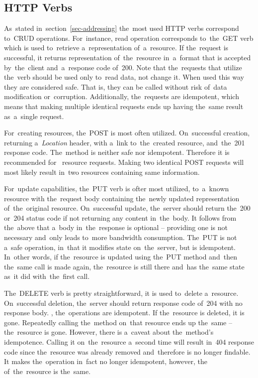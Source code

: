 \subsection{HTTP Verbs}
\label{lab-verbs}
As~stated in~section~\ref{sec-addressing} the~most used HTTP verbs correspond
to~CRUD operations. For~instance, read operation corresponds to~the~GET verb
which is used to~retrieve a~representation of~a~resource. If the~request is
successful, it returns representation of~the~resource in~a~format that is
accepted by~the~client and~a~response code of~200. Note that the~requests that
utilize the~verb should be used only to~read data, not change it. When used this
way they are considered safe. That is, they can be called without risk of~data
modification or~corruption. Additionally, the~requests are idempotent, which
means that making multiple identical requests ends up having the~same result
as~a~single request.

For~creating resources, the~POST is most often utilized. On~successful creation,
returning a~\textit{Location} header, with a~link to~the~created resource,
and~the~201 response code. The~method is neither safe nor idempotent. Therefore
it is recommended for~ resource requests. Making two
identical POST requests will most likely result in~two resources containing same
information.

For~update capabilities, the~PUT verb is ofter most utilized, 
to~a~known resource with the~request body containing the~newly updated
representation of~the~original resource. On~successful update, the~server should
return the~200 or~204 status code if not returning any content in~the~body. It
follows from the~above that a~body in~the~response is optional -- providing one
is not necessary and~only leads to~more bandwidth consumption. The~PUT is not
a~safe operation, in~that it modifies state on~the~server, but is idempotent.
In~other words, if the~resource is updated using the~PUT method and~then
the~same call is made again, the~resource is still there and~has the~same state
as~it did with~the~first call.

The~DELETE verb is pretty straightforward, it is used to~delete a~resource.
On~successful deletion, the~server should return response code of~204 with no
response body. , the~operations are idempotent. If
the~resource is deleted, it is gone. Repeatedly calling the~method on~that
resource ends up the~same -- the~resource is gone. However, there is a~caveat
about the~method's idempotence. Calling it on~the~resource a~second time will
result in~404 response code since the~resource was already removed and~therefore
is no longer findable. It makes the~operation in~fact no longer idempotent,
however, the~ of~the~resource is the~same.



